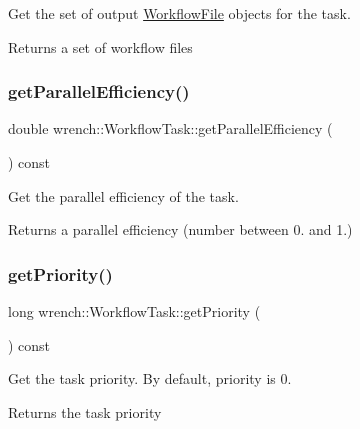 Get the set of output \hyperlink{classwrench_1_1_workflow_file}{Workflow\+File} objects for the task. 

\begin{DoxyReturn}{Returns}
a set of workflow files 
\end{DoxyReturn}
\mbox{\label{classwrench_1_1_workflow_task_ab7e3113ba73aebc6e2776a6e56984662}} 
\subsubsection{\texorpdfstring{get\+Parallel\+Efficiency()}{getParallelEfficiency()}}
{\footnotesize\ttfamily double wrench\+::\+Workflow\+Task\+::get\+Parallel\+Efficiency (\begin{DoxyParamCaption}{ }\end{DoxyParamCaption}) const}



Get the parallel efficiency of the task. 

\begin{DoxyReturn}{Returns}
a parallel efficiency (number between 0. and 1.) 
\end{DoxyReturn}
\mbox{\label{classwrench_1_1_workflow_task_a330d0b94f3958a6542ba8ce033448197}} 
\subsubsection{\texorpdfstring{get\+Priority()}{getPriority()}}
{\footnotesize\ttfamily long wrench\+::\+Workflow\+Task\+::get\+Priority (\begin{DoxyParamCaption}{ }\end{DoxyParamCaption}) const}



Get the task priority. By default, priority is 0. 

\begin{DoxyReturn}{Returns}
the task priority 
\end{DoxyReturn}
\mbox{\label{classwrench_1_1_workflow_task_a15bbd1fca442b459073164b52dcc44b0}} 
